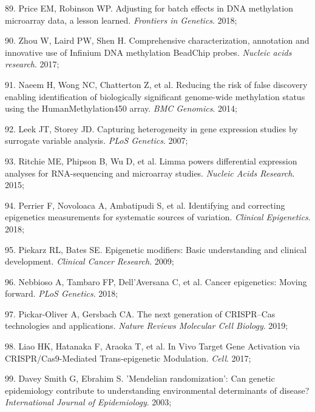 \documentclass[11pt,oneside]{bristolthesis}
\newenvironment{cslreferences}%
  {}%
  {\par}
\begin{document}
\begin{cslreferences}
\leavevmode\hypertarget{ref-Price2018}{}%
89. Price EM, Robinson WP. Adjusting for batch effects in DNA methylation microarray data, a lesson learned. \emph{Frontiers in Genetics}. 2018;

\leavevmode\hypertarget{ref-Zhou2017}{}%
90. Zhou W, Laird PW, Shen H. Comprehensive characterization, annotation and innovative use of Infinium DNA methylation BeadChip probes. \emph{Nucleic acids research}. 2017;

\leavevmode\hypertarget{ref-Naeem2014}{}%
91. Naeem H, Wong NC, Chatterton Z, et al. Reducing the risk of false discovery enabling identification of biologically significant genome-wide methylation status using the HumanMethylation450 array. \emph{BMC Genomics}. 2014;

\leavevmode\hypertarget{ref-Leek2007}{}%
92. Leek JT, Storey JD. Capturing heterogeneity in gene expression studies by surrogate variable analysis. \emph{PLoS Genetics}. 2007;

\leavevmode\hypertarget{ref-Ritchie2015}{}%
93. Ritchie ME, Phipson B, Wu D, et al. Limma powers differential expression analyses for RNA-sequencing and microarray studies. \emph{Nucleic Acids Research}. 2015;

\leavevmode\hypertarget{ref-Perrier2018}{}%
94. Perrier F, Novoloaca A, Ambatipudi S, et al. Identifying and correcting epigenetics measurements for systematic sources of variation. \emph{Clinical Epigenetics}. 2018;

\leavevmode\hypertarget{ref-Piekarz2009}{}%
95. Piekarz RL, Bates SE. Epigenetic modifiers: Basic understanding and clinical development. \emph{Clinical Cancer Research}. 2009;

\leavevmode\hypertarget{ref-Nebbioso2018}{}%
96. Nebbioso A, Tambaro FP, Dell'Aversana C, et al. Cancer epigenetics: Moving forward. \emph{PLoS Genetics}. 2018;

\leavevmode\hypertarget{ref-Pickar-Oliver2019}{}%
97. Pickar-Oliver A, Gersbach CA. The next generation of CRISPR--Cas technologies and applications. \emph{Nature Reviews Molecular Cell Biology}. 2019;

\leavevmode\hypertarget{ref-Liao2017}{}%
98. Liao HK, Hatanaka F, Araoka T, et al. In Vivo Target Gene Activation via CRISPR/Cas9-Mediated Trans-epigenetic Modulation. \emph{Cell}. 2017;

\leavevmode\hypertarget{ref-DaveySmith2003}{}%
99. Davey Smith G, Ebrahim S. 'Mendelian randomization': Can genetic epidemiology contribute to understanding environmental determinants of disease? \emph{International Journal of Epidemiology}. 2003;


\end{cslreferences}
\end{document}
